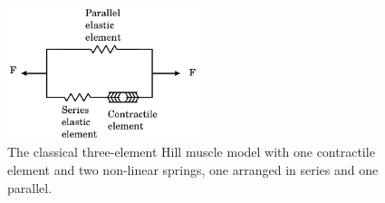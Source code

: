 

\begin{figure}[htbp]
  \centering
    \includegraphics[width=0.5\textwidth]{chapters/introduction/figures/Hill_muscle_model.pdf}
\caption{The classical three-element Hill muscle model with one
  contractile element and two non-linear springs, one arranged in
  series and one parallel. }
\label{fig:hill_muscle_model}
\end{figure}



